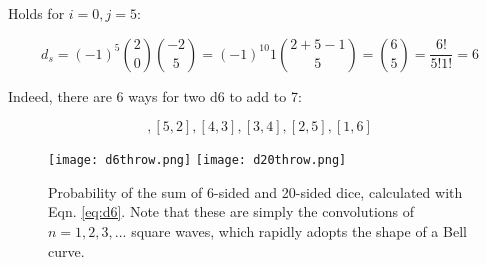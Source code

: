 Holds for $i=0, j=5$:

\begin{equation}
d_s = (-1)^5 {2 \choose 0}{-2 \choose 5} = (-1)^{10} 1 {2+5-1 \choose 5} = {6 \choose 5} = \frac{6!}{5!1!} = 6
\label{eq:d6}
\end{equation}

Indeed, there are 6 ways for two d6 to add to 7:

\begin{equation}
[6,1],[5,2],[4,3],[3,4],[2,5],[1,6]
\end{equation}


\begin{figure}
\centering
\texttt{[image: d6throw.png]}
\texttt{[image: d20throw.png]}
\caption{Probability of the sum of 6-sided and 20-sided dice, calculated with Eqn. \ref{eq:d6}. Note that these are simply the convolutions of $n=1,2,3,...$ square waves, which rapidly adopts the shape of a Bell curve.}
\end{figure}

